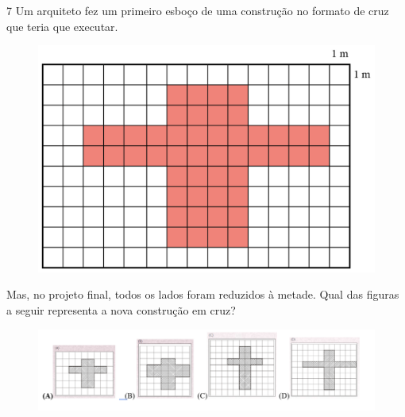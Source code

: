 \begin{emptybox}
\end{emptybox}


\num{7} Um arquiteto fez um primeiro esboço de uma construção no formato de
cruz que teria que executar.

\begin{figure}[htpb!]
\centering
\includegraphics[width=\textwidth]{../ilustracoes/MAT5/SAEB_5ANO_MAT_figura41.png}
\end{figure}

Mas, no projeto final, todos os lados foram reduzidos à metade. Qual das
figuras a seguir representa a nova construção em cruz?

\begin{figure}[htpb!]
\includegraphics[width=\textwidth]{./imgs/mat6.png}
\end{figure}

